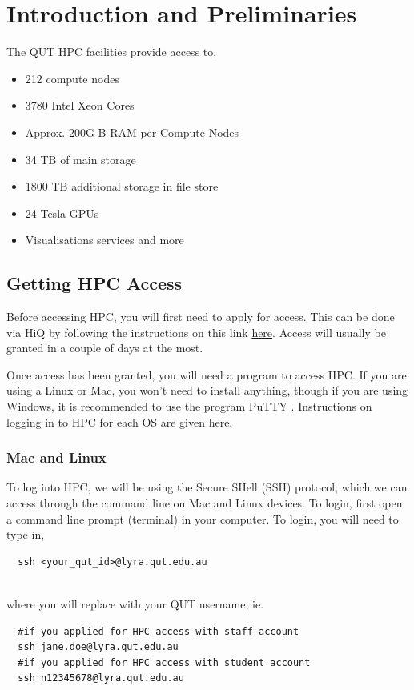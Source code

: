 \section{Introduction and Preliminaries}
%
%
%
%
The QUT HPC facilities provide access to,
\begin{itemize}
\item 212 compute nodes
\item 3780 Intel Xeon Cores
\item Approx. 200G B RAM per Compute Nodes
\item 34 TB of main storage
\item 1800 TB additional storage in file store
\item 24 Tesla GPUs
\item Visualisations services and more
\end{itemize}
%
%
%
\subsection{Getting HPC Access}
Before accessing HPC, you will first need to apply for access. This can be done via HiQ by following the instructions on this link \href{https://qutvirtual4.qut.edu.au/group/research-students/doing-your-research/specialty-research-facilities/apply-for-a-high-performance-compute-hpc-account}{here}. Access will usually be granted in a couple of days at the most.
%
%
\par
%
%
Once access has been granted, you will need a program to access HPC. If you are using a Linux or Mac, you won't need to install anything, though if you are using Windows, it is recommended to use the program PuTTY \cite{putty}. Instructions on logging in to HPC for each OS are given here.
%
%
\subsubsection{Mac and Linux}
To log into HPC, we will be using the Secure SHell (SSH) protocol, which we can access through the command line on Mac and Linux devices. To login, first open a command line prompt (terminal) in your computer. To login, you will need to type in,
\\
\par
\begin{verbatim}
  ssh <your_qut_id>@lyra.qut.edu.au
\end{verbatim}
\\
where you will replace  with your QUT username, ie.
\\
\par
\begin{verbatim}
  #if you applied for HPC access with staff account
  ssh jane.doe@lyra.qut.edu.au
  #if you applied for HPC access with student account
  ssh n12345678@lyra.qut.edu.au
\end{verbatim}
%
%
%
%
